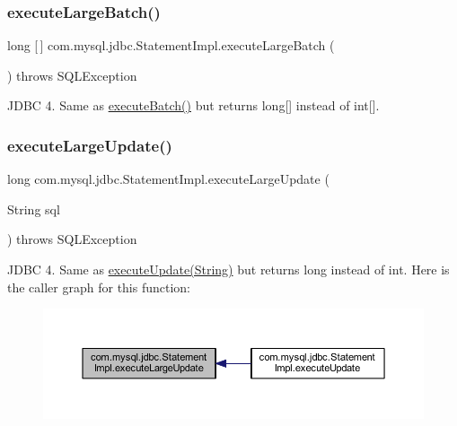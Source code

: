 \subsubsection{\texorpdfstring{execute\+Large\+Batch()}{executeLargeBatch()}}
{\footnotesize\ttfamily long \mbox{[}$\,$\mbox{]} com.\+mysql.\+jdbc.\+Statement\+Impl.\+execute\+Large\+Batch (\begin{DoxyParamCaption}{ }\end{DoxyParamCaption}) throws S\+Q\+L\+Exception}

J\+D\+BC 4. Same as \mbox{\hyperlink{classcom_1_1mysql_1_1jdbc_1_1_statement_impl_acf49c07c2b02c99e25719bb916bc0b39}{execute\+Batch()}} but returns long\mbox{[}\mbox{]} instead of int\mbox{[}\mbox{]}. \mbox{\label{classcom_1_1mysql_1_1jdbc_1_1_statement_impl_a5419f848505968483a4ce341ee408877}} 
\subsubsection{\texorpdfstring{execute\+Large\+Update()}{executeLargeUpdate()}\hspace{0.1cm}{\footnotesize\ttfamily [1/4]}}
{\footnotesize\ttfamily long com.\+mysql.\+jdbc.\+Statement\+Impl.\+execute\+Large\+Update (\begin{DoxyParamCaption}\item[{String}]{sql }\end{DoxyParamCaption}) throws S\+Q\+L\+Exception}

J\+D\+BC 4. Same as \mbox{\hyperlink{classcom_1_1mysql_1_1jdbc_1_1_statement_impl_aa968966221a50357d4ed7f2d72a94bf6}{execute\+Update(\+String)}} but returns long instead of int. Here is the caller graph for this function\+:
\nopagebreak
\begin{figure}[H]
\begin{center}
\leavevmode
\includegraphics[width=350pt]{classcom_1_1mysql_1_1jdbc_1_1_statement_impl_a5419f848505968483a4ce341ee408877_icgraph}
\end{center}
\end{figure}
\mbox{\label{classcom_1_1mysql_1_1jdbc_1_1_statement_impl_a314534ca8391965ccfcc15a656ea17c2}} 
